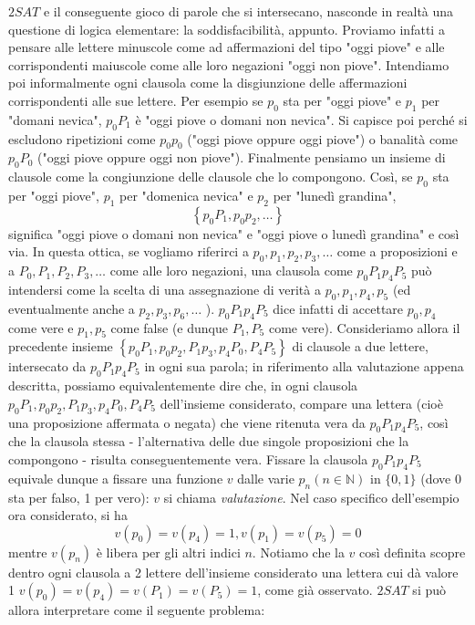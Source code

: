 \begin{enumerate}
          $2 S A T$ e il conseguente gioco di parole che si intersecano,
          nasconde in realtà una questione di logica elementare: la
          soddisfacibilità, appunto. Proviamo infatti a pensare alle lettere
          minuscole come ad affermazioni del tipo "oggi piove" e alle
          corrispondenti maiuscole come alle loro negazioni "oggi non piove".
          Intendiamo poi informalmente ogni clausola come la disgiunzione delle
          affermazioni corrispondenti alle sue lettere. Per esempio se $p_0$ sta
          per "oggi piove" e $p_1$ per "domani nevica", $p_0 P_1$ è "oggi piove
          o domani non nevica". Si capisce poi perché si escludono ripetizioni
          come $p_0 p_0$ ("oggi piove oppure oggi piove") o banalità come $p_0
              P_0$ ("oggi piove oppure oggi non piove"). Finalmente pensiamo un
          insieme di clausole come la congiunzione delle clausole che lo
          compongono. Così, se $p_0$ sta per "oggi piove", $p_1$ per "domenica
          nevica" e $p_2$ per "lunedì grandina",
          $$
              \left\{p_0 P_1, p_0 p_2, \ldots\right\}
          $$
          significa "oggi piove o domani non nevica" e "oggi piove o lunedì
          grandina" e così via. In questa ottica, se vogliamo riferirci a $p_0,
              p_1, p_2, p_3, \ldots$ come a proposizioni e a $P_0, P_1, P_2, P_3,
              \ldots$ come alle loro negazioni, una clausola come $p_0 P_1 p_4 P_5$
          può intendersi come la scelta di una assegnazione di verità a $p_0,
              p_1, p_4, p_5$ (ed eventualmente anche a $p_2, p_3, p_6, \ldots$ ).
          $p_0 P_1 p_4 P_5$ dice infatti di accettare $p_0, p_4$ come vere e
          $p_1, p_5$ come false (e dunque $P_1, P_5$ come vere). Consideriamo
          allora il precedente insieme $\left\{p_0 P_1, p_0 p_2, P_1 p_3, p_4
              P_0, P_4 P_5\right\}$ di clausole a due lettere, intersecato da $p_0
              P_1 p_4 P_5$ in ogni sua parola; in riferimento alla valutazione
          appena descritta, possiamo equivalentemente dire che, in ogni clausola
          $p_0 P_1, p_0 p_2, P_1 p_3, p_4 P_0, P_4 P_5$ dell'insieme
          considerato, compare una lettera (cioè una proposizione affermata o
          negata) che viene ritenuta vera da $p_0 P_1 p_4 P_5$, così che la
          clausola stessa - l'alternativa delle due singole proposizioni che la
          compongono - risulta conseguentemente vera. Fissare la clausola $p_0
              P_1 p_4 P_5$ equivale dunque a fissare una funzione $v$ dalle varie
          $p_n(n \in \mathbb{N})$ in $\{0,1\}$ (dove 0 sta per falso, 1 per
          vero): $v$ si chiama \textit{valutazione}. Nel caso specifico dell'esempio ora considerato, si ha
          $$
              v\left(p_0\right)=v\left(p_4\right)=1, v\left(p_1\right)=v\left(p_5\right)=0
          $$
          mentre $v\left(p_n\right)$ è libera per gli altri indici $n$. Notiamo
          che la $v$ così definita scopre dentro ogni clausola a 2 lettere
          dell'insieme considerato una lettera cui dà valore 1
          $v\left(p_0\right)=v\left(p_4\right)=v\left(P_1\right)=v\left(P_5\right)=1$,
          come già osservato. $2 S A T$ si può allora interpretare come il
          seguente problema:


\end{enumerate}

